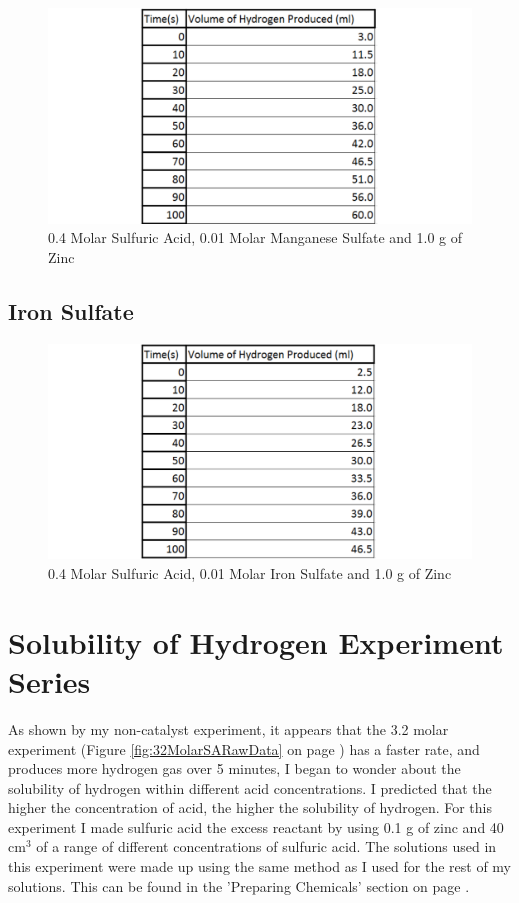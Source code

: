 \begin{figure}[H]
    \includegraphics[width=\textwidth]{./Experiment/Images/4DifferentCatalysts/Manganese.pdf}
    \caption{0.4 Molar Sulfuric Acid, 0.01 Molar Manganese Sulfate and 1.0 g of Zinc} \label{fig:ManganeseRawData}
\end{figure}

	\subsection{Iron Sulfate}

\begin{figure}[H]
    \includegraphics[width=\textwidth]{./Experiment/Images/4DifferentCatalysts/Iron.pdf}
    \caption{0.4 Molar Sulfuric Acid, 0.01 Molar Iron Sulfate and 1.0 g of Zinc} \label{fig:IronRawData}
\end{figure}


\section{Solubility of Hydrogen Experiment Series}

As shown by my non-catalyst experiment, it appears that the 3.2 molar experiment (Figure \ref{fig:32MolarSARawData} on page \pageref{fig:32MolarSARawData}) has a faster rate, and produces more hydrogen gas over 5 minutes, I began to wonder about the solubility of hydrogen within different acid concentrations. I predicted that the higher the concentration of acid, the higher the solubility of hydrogen. For this experiment I made sulfuric acid the excess reactant by using 0.1 g of zinc and 40 cm$^3$ of a range of different concentrations of sulfuric acid. The solutions used in this experiment were made up using the same method as I used for the rest of my solutions. This can be found in the 'Preparing Chemicals' section on page \pageref{Preparing Chemicals}.


